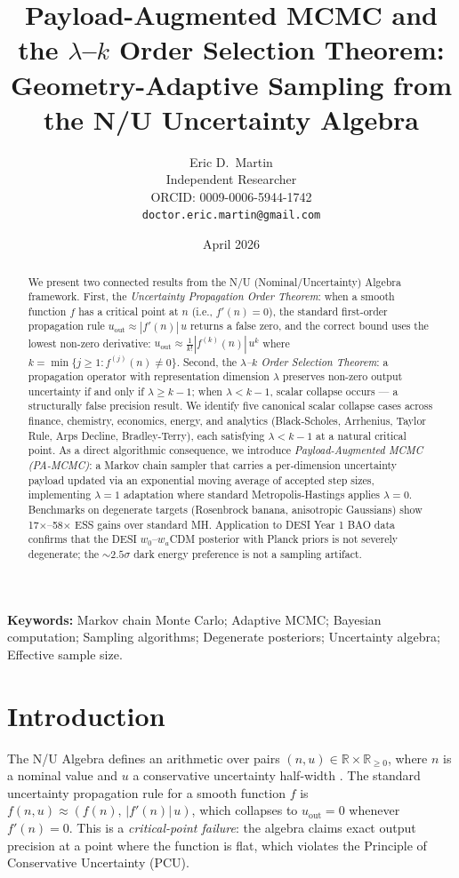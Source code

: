 \documentclass[11pt]{article}
\title{Payload-Augmented MCMC and the $\lambda$--$k$ Order Selection Theorem:\\
  Geometry-Adaptive Sampling from the N/U Uncertainty Algebra}
\author{Eric D.\ Martin\\[4pt]
  Independent Researcher\\
  ORCID: 0009-0006-5944-1742\\
  \texttt{doctor.eric.martin@gmail.com}}
\date{April 2026}
\theoremstyle{definition}
\begin{document}
\maketitle

\begin{abstract}
We present two connected results from the N/U (Nominal/Uncertainty) Algebra
framework.
First, the \emph{Uncertainty Propagation Order Theorem}: when a smooth function $f$
has a critical point at $n$ (i.e., $f'(n)=0$), the standard first-order propagation
rule $u_{\text{out}} \approx |f'(n)|\,u$ returns a false zero, and the correct bound
uses the lowest non-zero derivative:
$u_{\text{out}} \approx \frac{1}{k!}|f^{(k)}(n)|\,u^k$
where $k = \min\{j \ge 1 : f^{(j)}(n) \ne 0\}$.
Second, the \emph{$\lambda$--$k$ Order Selection Theorem}: a propagation operator
with representation dimension $\lambda$ preserves non-zero output uncertainty if and
only if $\lambda \ge k-1$; when $\lambda < k-1$, scalar collapse occurs — a
structurally false precision result.
We identify five canonical scalar collapse cases across finance, chemistry, economics,
energy, and analytics (Black-Scholes, Arrhenius, Taylor Rule, Arps Decline,
Bradley-Terry), each satisfying $\lambda < k-1$ at a natural critical point.
As a direct algorithmic consequence, we introduce \emph{Payload-Augmented MCMC
(PA-MCMC)}: a Markov chain sampler that carries a per-dimension uncertainty payload
updated via an exponential moving average of accepted step sizes, implementing
$\lambda=1$ adaptation where standard Metropolis-Hastings applies $\lambda=0$.
Benchmarks on degenerate targets (Rosenbrock banana, anisotropic Gaussians) show
17$\times$--58$\times$ ESS gains over standard MH.
Application to DESI Year 1 BAO data confirms that the DESI $w_0$--$w_a$CDM posterior
with Planck priors is not severely degenerate; the ${\sim}2.5\sigma$ dark energy
preference is not a sampling artifact.
\end{abstract}

\noindent\textbf{Keywords:} Markov chain Monte Carlo; Adaptive MCMC; Bayesian
computation; Sampling algorithms; Degenerate posteriors; Uncertainty algebra;
Effective sample size.

\section{Introduction}

The N/U Algebra defines an arithmetic over pairs $(n, u) \in \mathbb{R} \times
\mathbb{R}_{\ge 0}$, where $n$ is a nominal value and $u$ a conservative
uncertainty half-width \cite{martin2025nasa}.
The standard uncertainty propagation rule for a smooth function $f$ is
$f(n, u) \approx (f(n),\, |f'(n)|\,u)$,
which collapses to $u_{\text{out}} = 0$ whenever $f'(n) = 0$.
This is a \emph{critical-point failure}: the algebra claims exact output
precision at a point where the function is flat, which violates the Principle of
Conservative Uncertainty (PCU).
\end{document}

